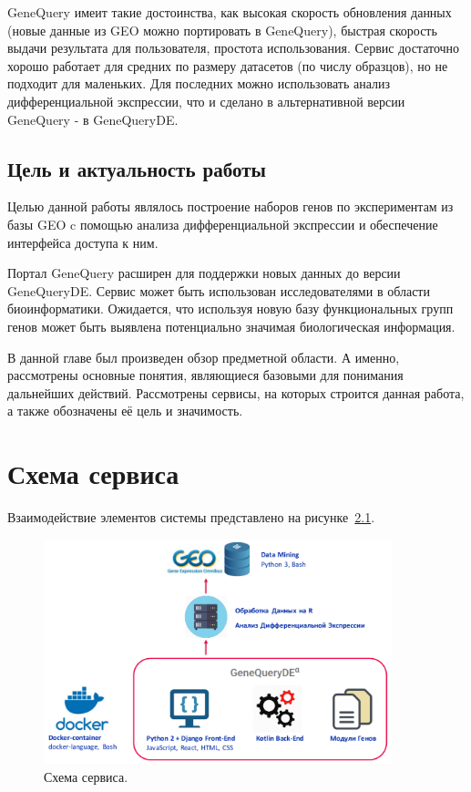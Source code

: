 \documentclass[times,specification,annotation]{itmo-student-thesis}
\begin{document}
GeneQuery имеит такие достоинства, как высокая скорость обновления данных (новые данные из GEO можно портировать в GeneQuery), быстрая скорость выдачи результата для пользователя, простота использования. Сервис достаточно хорошо работает для средних по размеру датасетов (по числу образцов), но не подходит для маленьких. Для последних можно использовать анализ дифференциальной экспрессии, что и сделано в альтернативной версии GeneQuery - в GeneQueryDE. 

\section{Цель и актуальность работы}

Целью данной работы являлось построение наборов генов по экспериментам из базы GEO c помощью анализа дифференциальной экспрессии и обеспечение интерфейса доступа к ним. 

Портал GeneQuery расширен для поддержки новых данных до версии GeneQueryDE. Сервис может быть использован исследователями в области биоинформатики. Ожидается, что используя новую базу функциональных групп генов может быть выявлена потенциально значимая биологическая информация. 

\chapterconclusion

В данной главе был произведен обзор предметной области. А именно, рассмотрены основные понятия, являющиеся базовыми для понимания дальнейших действий. Рассмотрены сервисы, на которых строится данная работа, а также обозначены её цель и значимость. 
\finishrelatedwork

\chapter{Схема сервиса}

Взаимодействие элементов системы представлено на рисунке~\ref{service}. 

\begin{figure}[!h]
    \caption{Схема сервиса.}\label{service}
    \centering
    \includegraphics[width=0.9\textwidth]{service_scheme.png}
\end{figure}
\end{document}
